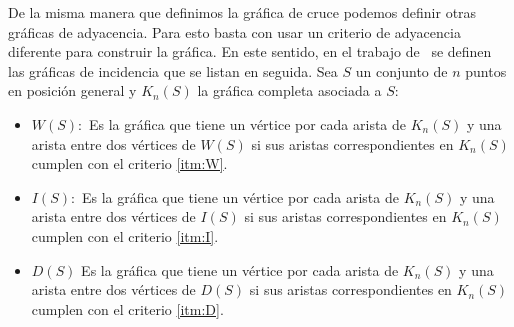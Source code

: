 

%

De la misma manera que definimos la gráfica de cruce podemos definir otras
gráficas de adyacencia. Para esto basta con usar un criterio de adyacencia diferente
para construir la gráfica. En este sentido, en el trabajo de~\cite{Araujo2005}
se definen las gráficas de incidencia que se listan en seguida.
Sea $S$ un conjunto de $n$ puntos en posición general y $K_n(S)$
la gráfica completa asociada a $S$:

\begin{itemize}
  \item $W(S):$ Es la gráfica que tiene un vértice por cada arista de $K_n(S)$ y
  una arista entre dos vértices de $W(S)$ si sus aristas correspondientes en $K_n(S)$
  cumplen con el criterio \ref{itm:W}.
  \item $I(S):$ Es la gráfica que tiene un vértice por cada arista de $K_n(S)$ y
  una arista entre dos vértices de $I(S)$ si sus aristas correspondientes en $K_n(S)$
  cumplen con el criterio \ref{itm:I}.
  \item $D(S)$ Es la gráfica que tiene un vértice por cada arista de $K_n(S)$ y
  una arista entre dos vértices de $D(S)$ si sus aristas correspondientes en $K_n(S)$
  cumplen con el criterio \ref{itm:D}.
\end{itemize}

